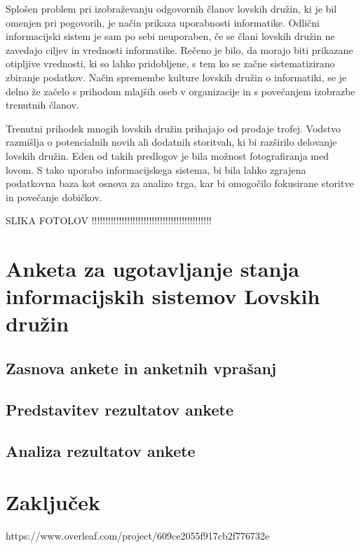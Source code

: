 \documentclass[a4paper,12pt,openright]{book}
\begin{document}
Splošen problem pri izobraževanju odgovornih članov lovskih družin, ki je bil omenjen pri pogovorih, je način prikaza uporabnosti informatike. 
Odlični informacijski sistem je sam po sebi neuporaben, če se člani lovskih družin ne zavedajo ciljev in vrednosti informatike. 
Rečeno je bilo, da morajo biti prikazane otipljive vrednosti, ki so lahko pridobljene, s tem ko se začne sistematizirano zbiranje podatkov. 
Način spremembe kulture lovskih družin o informatiki, se je delno že začelo s prihodom mlajših oseb v organizacije in s povečanjem izobrazbe trenutnih članov.

Trenutni prihodek mnogih lovskih družin prihajajo od prodaje trofej. 
Vodstvo razmišlja o potencialnih novih ali dodatnih storitvah, ki bi razširilo delovanje lovskih družin. 
Eden od takih predlogov je bila možnost fotografiranja med lovom. 
S tako uporabo informacijskega sistema, bi bila lahko zgrajena podatkovna baza kot osnova za analizo trga, kar bi omogočilo fokusirane storitve in povečanje dobičkov. 

SLIKA FOTOLOV !!!!!!!!!!!!!!!!!!!!!!!!!!!!!!!!!!!!!!!!!!!!





\chapter{Anketa za ugotavljanje stanja informacijskih sistemov Lovskih družin}
\label{stroka}

\section{Zasnova ankete in anketnih vprašanj}

\section{Predstavitev rezultatov ankete}

\section{Analiza rezultatov ankete}


\chapter{Zaključek}  %
\label{end}


\cleardoublepage
{}

\printbibliography[heading=bibintoc,type=article,title={Članki v revijah}]
https://www.overleaf.com/project/609ce2055f917cb2f776732e
\printbibliography[heading=bibintoc,type=inproceedings,title={Članki v zbornikih}]

\printbibliography[heading=bibintoc,type=incollection,title={Poglavja v knjigah}]

\printbibliography[heading=bibintoc,title={Celotna literatura}]
\end{document}
